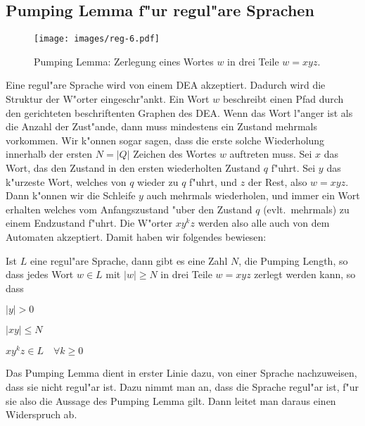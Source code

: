 \subsection{Pumping Lemma f"ur regul"are Sprachen\label{regulaer:pumpinglemma}}
\begin{figure}[H]
\begin{center}
\texttt{[image: images/reg-6.pdf]}
\end{center}
\caption{Pumping Lemma: Zerlegung eines Wortes $w$ in drei Teile
$w=xyz$.\label{regular:pumpinglemma-graph}}
\end{figure}
Eine regul"are Sprache wird von einem DEA akzeptiert. Dadurch wird
die Struktur der W"orter eingeschr"ankt. Ein Wort $w$ beschreibt
einen Pfad durch den gerichteten beschriftenten Graphen des DEA.
Wenn das Wort l"anger ist als die Anzahl der Zust"ande, dann muss
mindestens ein Zustand mehrmals vorkommen. Wir k"onnen sogar
sagen, dass die erste solche Wiederholung innerhalb der ersten
$N = |Q|$ Zeichen des Wortes $w$ auftreten muss. Sei $x$ das Wort,
das den Zustand in den ersten wiederholten Zustand $q$ f"uhrt.
Sei $y$ das k"urzeste Wort, welches von $q$ wieder zu $q$ f"uhrt, und
$z$ der Rest, also $w=xyz$. Dann k"onnen wir die Schleife $y$
auch mehrmals wiederholen, und immer ein Wort erhalten welches
vom Anfangszustand "uber den Zustand $q$ (evlt.~mehrmals) zu einem
Endzustand f"uhrt. Die W"orter $xy^kz$ werden also alle auch von
dem Automaten akzeptiert. Damit haben wir folgendes bewiesen:
\begin{satz}
Ist $L$ eine regul"are Sprache, dann gibt es eine Zahl $N$, die Pumping Length, so dass
jedes Wort $w\in L$ mit $|w|\ge N$ in drei Teile
$w=xyz$ zerlegt werden kann, so dass
\begin{compactenum}
\item $|y| > 0$
\item $|xy|\le N$
\item $xy^kz\in L\quad\forall k\ge 0$
\end{compactenum}
\end{satz}

Das Pumping Lemma dient in erster Linie dazu, von einer Sprache
nachzuweisen, dass sie nicht regul"ar ist. Dazu nimmt man an, dass
die Sprache regul"ar ist, f"ur sie also die Aussage des Pumping Lemma
gilt. Dann leitet man daraus einen Widerspruch ab.

